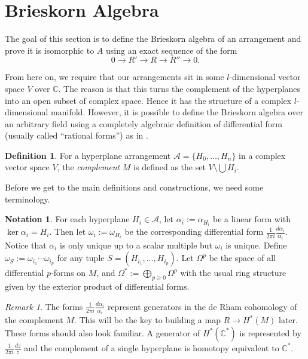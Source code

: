 \documentclass[article,twoside]{article}
\newcommand{\CC}{\mathbb{C}}
\newcommand{\script}[1]{\mathcal{#1}}
\theoremstyle{plain}
\theoremstyle{plain}
\theoremstyle{plain}
\theoremstyle{plain}
\theoremstyle{plain}
\theoremstyle{definition}
\newtheorem{definition}[definition]{Definition}
\theoremstyle{definition}
\newtheorem{notation}[notation]{Notation}
\theoremstyle{definition}
\theoremstyle{remark}
\theoremstyle{remark}
\newtheorem{remark}[remark]{Remark}
\begin{document}



\section{Brieskorn Algebra}

The goal of this section is to define the Brieskorn algebra of an arrangement and prove it is isomorphic to $A$ using an exact sequence of the form
$$
0\to R'\to R\to R''\to 0.
$$

From here on, we require that our arrangements sit in some $l$-dimensional vector space $V$ over $\CC$. The reason is that this turns the complement of the hyperplanes into an open subset of complex space. Hence it has the structure of a complex $l$-dimensional manifold. However, it is possible to define the Brieskorn algebra over an arbitrary field using a completely algebraic definition of differential form (usually called ``rational forms'') as in \cite{orlik_terao}.

\begin{definition}
	For a hyperplane arrangement $\script{A}=\{H_0,\dots,H_n\}$ in a complex vector space $V$, the \emph{complement} $M$ is defined as the set $V\setminus\bigcup H_i$.
\end{definition}

Before we get to the main definitions and constructions, we need some terminology.

\begin{notation}
	For each hyperplane $H_i\in\script{A}$, let $\alpha_i:=\alpha_{H_i}$ be a linear form with $\ker\alpha_i=H_i$. Then let $\omega_i:=\omega_{H_i}$ be the corresponding differential form $\frac{1}{2\pi i}\frac{d\alpha_i}{\alpha_i}$. Notice that $\alpha_i$ is only unique up to a scalar multiple but $\omega_i$ is unique. Define $\omega_S := \omega_{i_1}\cdots\omega_{i_p}$ for any tuple $S = (H_{i_1},\dots,H_{i_p})$. Let $\Omega^p$ be the space of all differential $p$-forms on $M$, and $\Omega^*:=\bigoplus_{p\geq 0} \Omega^p$ with the usual ring structure given by the exterior product of differential forms.
\end{notation}

\begin{remark}
	The forms $\frac{1}{2\pi i}\frac{d\alpha_i}{\alpha_i}$ represent generators in the de Rham cohomology of the complement $M$. This will be the key to building a map $R\to H^*(M)$ later. These forms should also look familiar. A generator of $H^*(\CC^*)$ is represented by $\frac{1}{2\pi i}\frac{dz}{z}$ and the complement of a single hyperplane is homotopy equivalent to $\CC^*$.
\end{remark}
\end{document}
